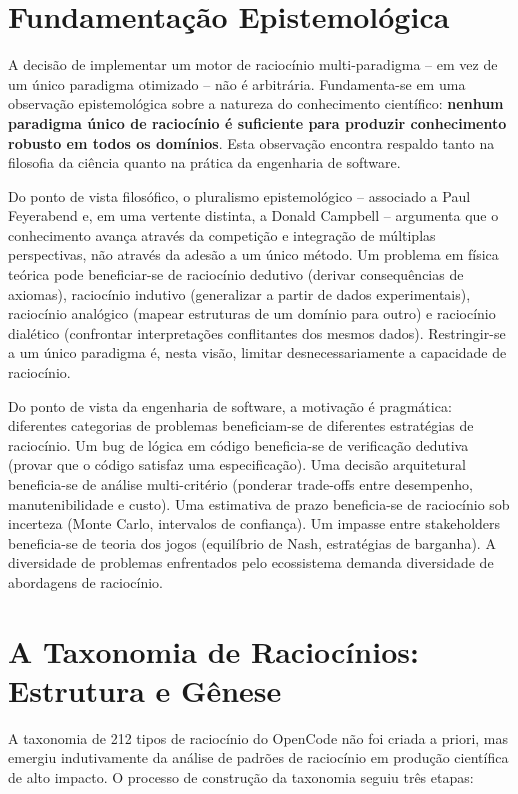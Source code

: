 \documentclass[12pt,a4paper,sumario=tradicional,openany]{abntex2}
\begin{document}
\section{Fundamentação Epistemológica}

A decisão de implementar um motor de raciocínio multi-paradigma -- em vez de um único paradigma otimizado -- não é arbitrária. Fundamenta-se em uma observação epistemológica sobre a natureza do conhecimento científico: \textbf{nenhum paradigma único de raciocínio é suficiente para produzir conhecimento robusto em todos os domínios}. Esta observação encontra respaldo tanto na filosofia da ciência quanto na prática da engenharia de software.

Do ponto de vista filosófico, o pluralismo epistemológico -- associado a Paul Feyerabend e, em uma vertente distinta, a Donald Campbell -- argumenta que o conhecimento avança através da competição e integração de múltiplas perspectivas, não através da adesão a um único método. Um problema em física teórica pode beneficiar-se de raciocínio dedutivo (derivar consequências de axiomas), raciocínio indutivo (generalizar a partir de dados experimentais), raciocínio analógico (mapear estruturas de um domínio para outro) e raciocínio dialético (confrontar interpretações conflitantes dos mesmos dados). Restringir-se a um único paradigma é, nesta visão, limitar desnecessariamente a capacidade de raciocínio.

Do ponto de vista da engenharia de software, a motivação é pragmática: diferentes categorias de problemas beneficiam-se de diferentes estratégias de raciocínio. Um bug de lógica em código beneficia-se de verificação dedutiva (provar que o código satisfaz uma especificação). Uma decisão arquitetural beneficia-se de análise multi-critério (ponderar trade-offs entre desempenho, manutenibilidade e custo). Uma estimativa de prazo beneficia-se de raciocínio sob incerteza (Monte Carlo, intervalos de confiança). Um impasse entre stakeholders beneficia-se de teoria dos jogos (equilíbrio de Nash, estratégias de barganha). A diversidade de problemas enfrentados pelo ecossistema demanda diversidade de abordagens de raciocínio.

\section{A Taxonomia de Raciocínios: Estrutura e Gênese}

A taxonomia de 212 tipos de raciocínio do OpenCode não foi criada a priori, mas emergiu indutivamente da análise de padrões de raciocínio em produção científica de alto impacto. O processo de construção da taxonomia seguiu três etapas:
\end{document}
